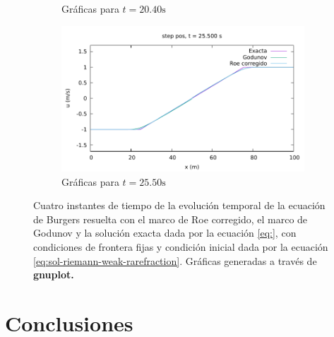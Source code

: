 \documentclass[12pt]{article}
\begin{document}
\begin{figure}[h]
\begin{subfigure}[b]{0.4\textwidth}
			\caption*{Gráficas para $t=20.40\unit{\second}$}
		\end{subfigure}
		\hfill
		\begin{subfigure}[b]{0.4\textwidth}
			\includegraphics[width=\textwidth]{../burgers1DVF/results/sol_fijas/step_pos-roe-fix//850.pdf}
			\caption*{Gráficas para $t=25.50\unit{\second}$}
		\end{subfigure}
		\caption{Cuatro instantes de tiempo de la evolución temporal de la ecuación de Burgers resuelta con el marco de Roe corregido, el marco de Godunov y la solución exacta dada por la ecuación \ref{eq:}, con condiciones de frontera fijas y condición inicial dada por la ecuación \ref{eq:sol-riemann-weak-rarefraction}. Gráficas generadas a través de \textbf{gnuplot.}}
		\label{fig:step_pos-roe-fix}
	\end{figure}
		
	\section{Conclusiones}
	\printbibliography
	
\end{document}
